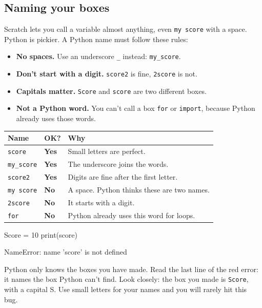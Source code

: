 \subsection*{Naming your boxes}

Scratch lets you call a variable almost anything, even \texttt{my score} with a space. Python is pickier. A Python name must follow these rules:

\begin{itemize}
  \item \textbf{No spaces.} Use an underscore \texttt{\_} instead: \texttt{my\_score}.
  \item \textbf{Don't start with a digit.} \texttt{score2} is fine, \texttt{2score} is not.
  \item \textbf{Capitals matter.} \texttt{Score} and \texttt{score} are two different boxes.
  \item \textbf{Not a Python word.} You can't call a box \texttt{for} or \texttt{import}, because Python already uses those words.
\end{itemize}

\begin{center}
\renewcommand{\arraystretch}{1.35}
\begin{tabular}{P{3.6cm} P{1.6cm} P{8.4cm}}
\toprule
\textbf{Name} & \textbf{OK?} & \textbf{Why} \\
\midrule
\texttt{score} & \textcolor{chalframe}{\textbf{Yes}} & Small letters are perfect. \\
\texttt{my\_score} & \textcolor{chalframe}{\textbf{Yes}} & The underscore joins the words. \\
\texttt{score2} & \textcolor{chalframe}{\textbf{Yes}} & Digits are fine after the first letter. \\
\texttt{my score} & \textcolor{errframe}{\textbf{No}} & A space. Python thinks these are two names. \\
\texttt{2score} & \textcolor{errframe}{\textbf{No}} & It starts with a digit. \\
\texttt{for} & \textcolor{errframe}{\textbf{No}} & Python already uses this word for loops. \\
\bottomrule
\end{tabular}
\end{center}

\begin{watchout}
\begin{codenonum}
Score = 10
print(score)
\end{codenonum}
\begin{errorbox}
NameError: name 'score' is not defined
\end{errorbox}
Python only knows the boxes you have made. Read the last line of the red error: it names the box Python can't find. Look closely: the box you made is \texttt{Score}, with a capital S. Use small letters for your names and you will rarely hit this bug.
\end{watchout}

